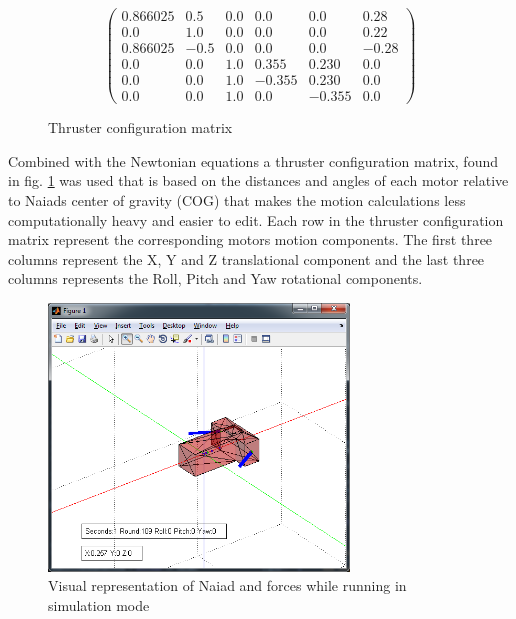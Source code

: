 \begin{center}
\begin{figure}[!ht]
\begin{equation}
\left(
\begin{array}{cccccc}
0.866025 & 0.5 & 0.0 & 0.0 & 0.0 & 0.28\\ 
0.0 & 1.0 & 0.0 & 0.0 & 0.0 & 0.22\\ 
0.866025 & -0.5 & 0.0 & 0.0 & 0.0 & -0.28\\ 
0.0 & 0.0 & 1.0 & 0.355 & 0.230 & 0.0\\ 
0.0 & 0.0 & 1.0 & -0.355 & 0.230 & 0.0\\ 
0.0 & 0.0 & 1.0 & 0.0 & -0.355 & 0.0
\end{array}
\right)
\end{equation}
\caption{\label{ThrusterConfig}Thruster configuration matrix}
\end{figure}
\end{center}

Combined with the Newtonian equations a thruster configuration matrix, found in fig. \ref{ThrusterConfig} was used that is based on the distances and angles of each motor relative to Naiads center of gravity (COG) that makes the motion calculations less computationally heavy and easier to edit.
Each row in the thruster configuration matrix represent the corresponding motors motion components. The first three columns represent the X, Y and Z translational component and the last three columns represents the Roll, Pitch and Yaw rotational components.

\begin{figure}[!ht]
\begin{center}
\includegraphics[width=80mm]{./Images/Software/simforward.png}
\caption{Visual representation of Naiad and forces while running in simulation mode}
\label{simforward}
\end{center}
\end{figure}

